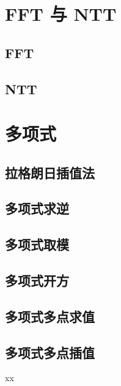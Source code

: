\section{FFT 与 NTT}

\subsection{FFT}

\subsection{NTT}

\section{多项式}

\subsection{拉格朗日插值法}

\subsection{多项式求逆}

\subsection{多项式取模}

\subsection{多项式开方}

\subsection{多项式多点求值}

\subsection{多项式多点插值}



\begin{problemset}
	\item xx
\end{problemset}


\nocite{*} 

